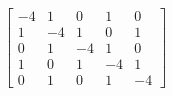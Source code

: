 \documentclass[preview]{standalone}
\begin{document}
\begin{align*}
\begin{bmatrix} -4 & 1 & 0 & 1 & 0 \\ 1 & -4 & 1 & 0 & 1 \\ 0 & 1 & -4 & 1 & 0 \\ 1 & 0 & 1 & -4 & 1 \\ 0 & 1 & 0 & 1 & -4 \end{bmatrix}
\end{align*}
\end{document}

